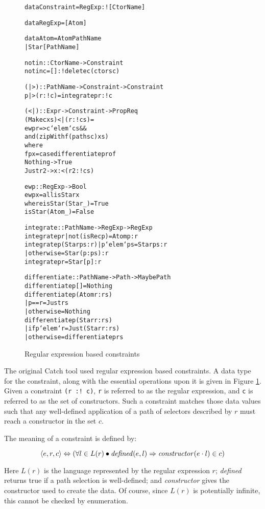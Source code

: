 \documentclass[preprint]{sigplanconf}
\newcommand{\T}[1]{\texttt{#1}}
\newcommand{\tup}[1]{\ensuremath{\langle #1 \rangle}}
\newenvironment{code}{\begin{alltt}\small}{\end{alltt}}
\newcommand{\D}{\ensuremath{\cdot}} %
\begin{document}
\begin{figure}
\begin{code}
data Constraint = RegExp :! [CtorName]

data RegExp = [Atom]

data Atom = Atom PathName
          | Star [PathName]

notin :: CtorName -> Constraint
notin c = [] :! delete c (ctors c)

(|>) :: PathName -> Constraint -> Constraint
p |> (r :! c) = integrate p r :! c

(<|) :: Expr -> Constraint -> Prop Req
(Make c xs) <| (r :! cs) =
    ewp r => c `elem` cs &&
    and (zipWith f (paths c) xs)
    where
    f p x = case differentiate p r of
                Nothing -> True
                Just r2 -> x :< (r2 :! cs)

ewp :: RegExp -> Bool
ewp x = all isStar x
   where isStar (Star _) = True
         isStar (Atom _) = False

integrate :: PathName -> RegExp -> RegExp
integrate p r | not (isRec p) = Atom p : r
integrate p (Star ps:r) | p `elem` ps = Star ps : r
                        | otherwise = Star (p:ps) : r
integrate p r = Star [p] : r

differentiate :: PathName -> Path -> Maybe Path
differentiate p [] = Nothing
differentiate p (Atom r:rs)
    | p == r = Just rs
    | otherwise = Nothing
differentiate p (Star r:rs)
    | if p `elem` r = Just (Star r:rs)
    | otherwise = differentiate p rs
\end{code}
\caption{Regular expression based constraints}
\label{fig:regexp}
\end{figure}

The original Catch tool used regular expression based constraints. A data type for the constraint, along with the essential operations upon it is given in Figure \ref{fig:regexp}. Given a constraint \T{(r :! c)}, \T{r} is referred to as the regular expression, and \T{c} is referred to as the set of constructors. Such a constraint matches those data values such that any well-defined application of a path of selectors described by $r$ must reach a constructor in the set $c$.

The meaning of a constraint is defined by:

\[ \tup{e,r,c} \Leftrightarrow (\forall l \in L(r) \bullet
\text{\textit{defined}}(e,l) \Rightarrow
\text{\textit{constructor}}(e\D{}l) \in c )
\]

Here $L(r)$ is the language represented by the regular expression $r$; \textit{defined} returns true if a path selection is well-defined; and \textit{constructor} gives the constructor used to create the data. Of course, since $L(r)$ is potentially infinite, this cannot be checked by enumeration.
\end{document}
